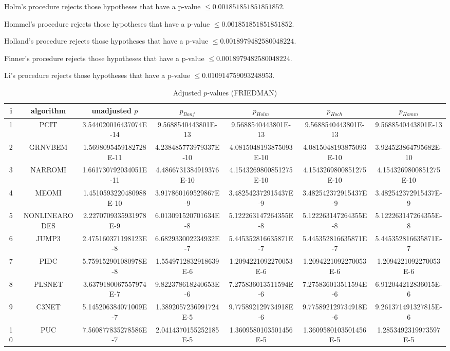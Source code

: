 \documentclass[a4paper,10pt]{article}
\begin{document}
\begin{landscape}
Holm's procedure rejects those hypotheses that have a p-value $\le0.001851851851851852$.


Hommel's procedure rejects those hypotheses that have a p-value $\le0.001851851851851852$.


Holland's procedure rejects those hypotheses that have a p-value $\le0.0018979482580048224$.


Finner's procedure rejects those hypotheses that have a p-value $\le0.0018979482580048224$.


Li's procedure rejects those hypotheses that have a p-value $\le0.010914759093248953$.



\newpage

\begin{table}[!htp]
\centering\scriptsize
\caption{Adjusted $p$-values (FRIEDMAN)}
\begin{tabular}{ccccccc}
i&algorithm&unadjusted $p$&$p_{Bonf}$&$p_{Holm}$&$p_{Hoch}$&$p_{Homm}$\\
\hline
1&PCIT&3.544020016437074E-14&9.5688540443801E-13&9.5688540443801E-13&9.5688540443801E-13&9.5688540443801E-13\\
2&GRNVBEM&1.5698095459182728E-11&4.238485773979337E-10&4.0815048193875093E-10&4.0815048193875093E-10&3.924523864795682E-10\\
3&NARROMI&1.661730792034051E-11&4.4866731384919376E-10&4.1543269800851275E-10&4.1543269800851275E-10&4.1543269800851275E-10\\
4&MEOMI&1.4510593220480988E-10&3.917860169529867E-9&3.482542372915437E-9&3.482542372915437E-9&3.482542372915437E-9\\
5&NONLINEARODES&2.2270709335931978E-9&6.013091520701634E-8&5.122263147264355E-8&5.122263147264355E-8&5.122263147264355E-8\\
6&JUMP3&2.475160371198123E-8&6.682933002234932E-7&5.445352816635871E-7&5.445352816635871E-7&5.445352816635871E-7\\
7&PIDC&5.759152901080978E-8&1.5549712832918639E-6&1.2094221092270053E-6&1.2094221092270053E-6&1.2094221092270053E-6\\
8&PLSNET&3.6379180067557974E-7&9.822378618240653E-6&7.275836013511594E-6&7.275836013511594E-6&6.912044212836015E-6\\
9&C3NET&5.145206384071009E-7&1.3892057236991724E-5&9.775892129734918E-6&9.775892129734918E-6&9.261371491327815E-6\\
10&PUC&7.560877835278586E-7&2.0414370155252185E-5&1.3609580103501456E-5&1.3609580103501456E-5&1.2853492319973597E-5\\

\end{tabular}
\end{table}
\end{landscape}
\end{document}

